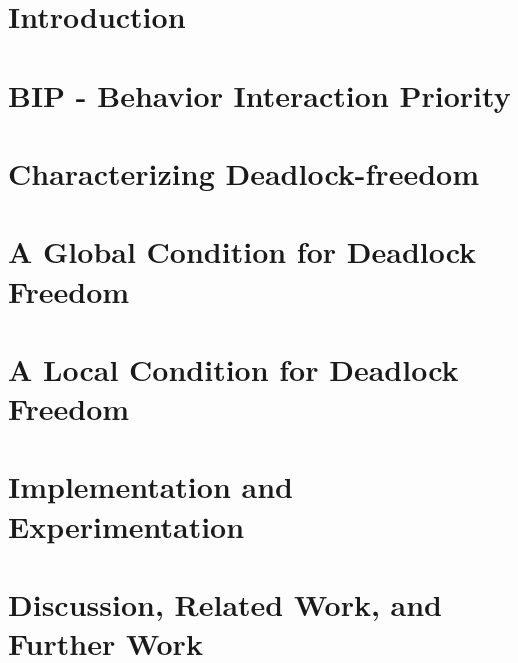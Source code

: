 





\section{Introduction}
\label{s:intro}



\section{BIP - Behavior Interaction Priority}
\label{s:bip}



\section{Characterizing Deadlock-freedom}
\label{s:characterize}



\section{A Global Condition for Deadlock Freedom}
\label{s:globCondition}


\section{A Local Condition for Deadlock Freedom}
\label{s:condition}



\section{Implementation and Experimentation}
\label{s:impl}



\section{Discussion, Related Work, and Further Work}
\label{s:discussion}












%
%


